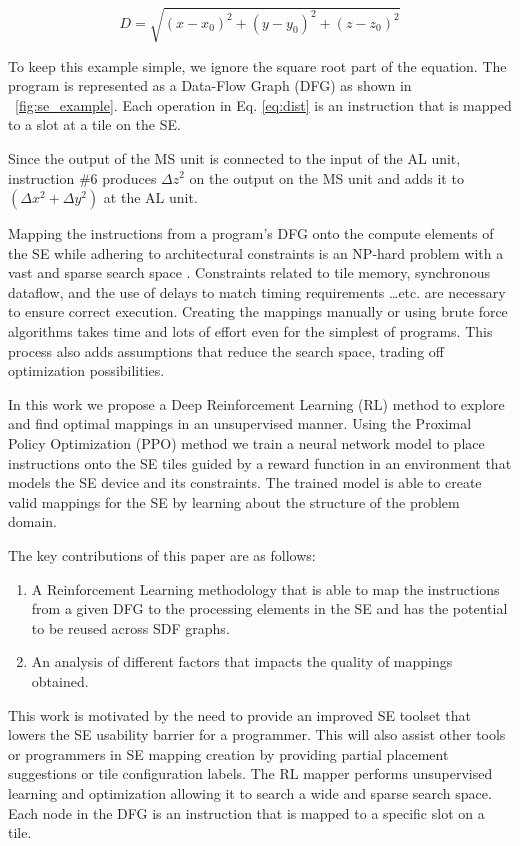 \begin{equation}
    \label{eq:dist}
    D = \sqrt{(x - x_0)^2 +(y - y_0)^2 + (z - z_0)^2}
\end{equation}

To keep this example simple, we ignore the square root part of the equation.
The program is represented as a Data-Flow Graph (DFG) as shown in \figurename~\ref{fig:se_example}.
Each operation in Eq. \ref{eq:dist} is an instruction that is mapped to a slot at a tile on the SE.

Since the output of the MS unit is connected to the input of the AL unit, instruction \#6 produces $\Delta z^2$ on the output on the MS unit and adds it to $(\Delta x^2 + \Delta y^2)$ at the AL unit.


Mapping the instructions from a program's DFG onto the compute elements of the SE while adhering to architectural constraints is an NP-hard problem with a vast and sparse search space \cite{10.1007/3-540-69346-7_30}. 
Constraints related to tile memory, synchronous dataflow, and the use of delays to match timing requirements \dots etc. are necessary to ensure correct execution. 
Creating the mappings manually or using brute force algorithms takes time and lots of effort even for the simplest of programs. 
This process also adds assumptions that reduce the search space, trading off optimization possibilities.  

In this work we propose a Deep Reinforcement Learning (RL) method to explore and find optimal mappings in an unsupervised manner. 
Using the Proximal Policy Optimization (PPO) method we train a neural network model to place instructions onto the SE tiles guided by a reward function in an environment that models the SE device and its constraints. 
The trained model is able to create valid mappings for the SE by learning about the structure of the problem domain. 


The key contributions of this paper are as follows:
\begin{enumerate}
    \item A Reinforcement Learning methodology that is able to map the instructions from a given DFG to the processing elements in the SE and has the potential to be reused across SDF graphs.
    \item An analysis of different factors that impacts the quality of mappings obtained.
\end{enumerate}

This work is motivated by the need to provide an improved SE toolset that lowers the SE usability barrier for a programmer.
This will also assist other tools or programmers in SE mapping creation by providing partial placement suggestions or tile configuration labels.
The RL mapper performs unsupervised learning and optimization allowing it to search a wide and sparse search space. 
Each node in the DFG is an instruction that is mapped to a specific slot on a tile.

